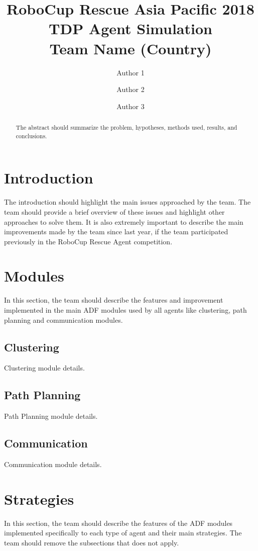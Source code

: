 \documentclass[runningheads,a4paper]{../llncs}
\begin{document}
\title{RoboCup Rescue Asia Pacific 2018\\
       TDP Agent Simulation\\
       Team Name (Country)}
\author{Author 1 \and Author 2 \and Author 3}
\maketitle
\begin{abstract}
The abstract should summarize the problem, hypotheses, methods used, results, and conclusions.
\end{abstract}
\section{Introduction}
The introduction should highlight the main issues approached by the team. The
team should provide a brief overview of these issues and highlight other
approaches to solve them. It is also extremely important to describe the main
improvements made by the team since last year, if the team participated
previously in the RoboCup Rescue Agent competition.
\section{Modules}
In this section, the team should describe the features and improvement
implemented in the main ADF modules used by all agents like clustering, path
planning and communication modules.
\subsection{Clustering}
Clustering module details.
\subsection{Path Planning}
Path Planning module details.
\subsection{Communication}
Communication module details.
\section{Strategies}
In this section, the team should describe the features of the ADF modules
implemented specifically to each type of agent and their main strategies. The
team should remove the subsections that does not apply.
\end{document}
